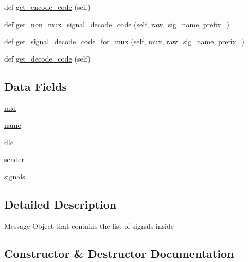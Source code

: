 \begin{DoxyCompactItemize}
def \hyperlink{classdbc__parse_1_1Message_a217e73cb097da11ce62221387f16ec60}{get\+\_\+encode\+\_\+code} (self)
\item 
def \hyperlink{classdbc__parse_1_1Message_abe79e8fe3b791f0f5d72b5960fb6262b}{get\+\_\+non\+\_\+mux\+\_\+signal\+\_\+decode\+\_\+code} (self, raw\+\_\+sig\+\_\+name, prefix=\textquotesingle{}\textquotesingle{})
\item 
def \hyperlink{classdbc__parse_1_1Message_aee532dc58e451dc9c4baa19ce247877b}{get\+\_\+signal\+\_\+decode\+\_\+code\+\_\+for\+\_\+mux} (self, mux, raw\+\_\+sig\+\_\+name, prefix=\textquotesingle{}\textquotesingle{})
\item 
def \hyperlink{classdbc__parse_1_1Message_a3a50af61714f75b64b167c039cba003a}{get\+\_\+decode\+\_\+code} (self)
\end{DoxyCompactItemize}
\subsection*{Data Fields}
\begin{DoxyCompactItemize}
\item 
\hyperlink{classdbc__parse_1_1Message_a1471af7a123cef3cdea575dccbaaa8ec}{mid}
\item 
\hyperlink{classdbc__parse_1_1Message_a740b3f2db8f50f6254f2dfbb75f39148}{name}
\item 
\hyperlink{classdbc__parse_1_1Message_ac0dfe459d45cc2c985fb00006d07129a}{dlc}
\item 
\hyperlink{classdbc__parse_1_1Message_a3d03a385559ab7062fc87b17b6b9becb}{sender}
\item 
\hyperlink{classdbc__parse_1_1Message_a17107ae20dc6a96313223c258f00d3a1}{signals}
\end{DoxyCompactItemize}


\subsection{Detailed Description}
\begin{DoxyVerb}Message Object that contains the list of signals inside
\end{DoxyVerb}
 

\subsection{Constructor \& Destructor Documentation}
